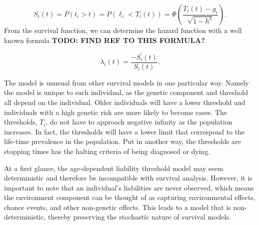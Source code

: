 \begin{equation}
S_i(t) = P(t_i > t) = P\left(\ell_i < T_i(t) \right) = \Phi\left(\dfrac{T_i(t) - g_i}{\sqrt{1 - h^2}}\right).
\end{equation}
From the survival function, we can determine the hazard function with a well known formula \textbf{TODO: FIND REF TO THIS FORMULA?}

\begin{equation}
\lambda_i(t) = \dfrac{-S_i^{'}(t)}{S_i(t)}.
\end{equation}

The model is unusual from other survival models in one particular way. Namely the model is unique to each individual, as the genetic component and threshold all depend on the individual. Older individuals will have a lower threshold and individuals with a high genetic risk are more likely to become cases. The thresholds, $ T_i $, do not have to approach negative infinity as the population increases. In fact, the thresholds will have a lower limit that correspond to the life-time prevalence in the population. Put in another way, the thresholds are stopping times has the halting criteria of being diagnosed or dying.

At a first glance, the age-dependent liability threshold model may seem deterministic and therefore be incompatible with survival analysis. However, it is important to note that an individual's liabilities are never observed, which means the environment component can be thought of as capturing environmental effects, chance events, and other non-genetic effects. This leads to a model that is non-deterministic, thereby preserving the stochastic nature of survival models.
